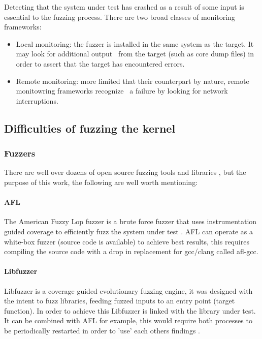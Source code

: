 Detecting that the system under test has crashed as a result of some input is essential to the fuzzing process.
There are two broad classes of monitoring frameworks\cite{mcnally12}:

\begin{itemize}
    \item Local monitoring: the fuzzer is installed in the same system as the target. It may look for additional output \
    from the target (such as core dump files) in order to assert that the target has encountered errors.
    \item Remote monitoring: more limited that their counterpart by nature, remote monitowring frameworks recognize \
    a failure by looking for network interruptions.
\end{itemize}

\subsection{Difficulties of fuzzing the kernel}


\subsubsection{Fuzzers}

There are well over dozens of open source fuzzing tools and libraries \cite{awesome-fuzzing}, but the purpose of this work, the following
are well worth mentioning:


\paragraph{AFL}

The American Fuzzy Lop fuzzer is a brute force fuzzer that uses instrumentation guided coverage to
efficiently fuzz the system under test \cite{afl}. AFL can operate as a white-box fuzzer (source code is available)
to achieve best results, this requires compiling the source code with a drop in replacement for gcc/clang
called afl-gcc.


\paragraph{Libfuzzer}

Libfuzzer is a coverage guided evolutionary fuzzing engine, it was designed with the intent to fuzz
libraries, feeding fuzzed inputs to an entry point (target function). In order to achieve this Libfuzzer
is linked with the library under test. It can be combined with AFL for example, this would require both processes to be
periodically restarted in order to 'use' each others findings \cite{libfuzzer}.


